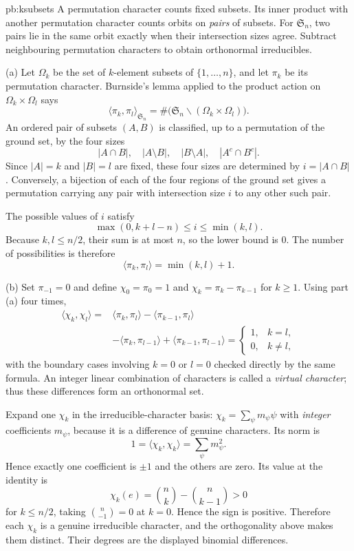 \begin{solution}{pb:ksubsets}
\idea A permutation character counts fixed subsets. Its inner product with another permutation character counts orbits on \emph{pairs} of subsets. For $\mathfrak S_n$, two pairs lie in the same orbit exactly when their intersection sizes agree. Subtract neighbouring permutation characters to obtain orthonormal irreducibles.

\writeup (a) Let $\Omega_k$ be the set of $k$-element subsets of $\{1,\ldots,n\}$, and let $\pi_k$ be its permutation character. Burnside's lemma applied to the product action on $\Omega_k\times\Omega_l$ says
\[
\langle\pi_k,\pi_l\rangle_{\mathfrak S_n}
=\#\bigl(\mathfrak S_n\backslash(\Omega_k\times\Omega_l)\bigr).
\]
An ordered pair of subsets $(A,B)$ is classified, up to a permutation of the ground set, by the four sizes
\[
|A\cap B|,\quad |A\setminus B|,\quad|B\setminus A|,\quad|A^c\cap B^c|.
\]
Since $|A|=k$ and $|B|=l$ are fixed, these four sizes are determined by $i=|A\cap B|$. Conversely, a bijection of each of the four regions of the ground set gives a permutation carrying any pair with intersection size $i$ to any other such pair.

The possible values of $i$ satisfy
\[
\max(0,k+l-n)\le i\le\min(k,l).
\]
Because $k,l\le n/2$, their sum is at most $n$, so the lower bound is $0$. The number of possibilities is therefore
\[
\boxed{\langle\pi_k,\pi_l\rangle=\min(k,l)+1}.
\]

(b) Set $\pi_{-1}=0$ and define $\chi_0=\pi_0=1$ and $\chi_k=\pi_k-\pi_{k-1}$ for $k\ge1$. Using part (a) four times,
\[
\begin{aligned}
\langle\chi_k,\chi_l\rangle
={}&\langle\pi_k,\pi_l\rangle
-\langle\pi_{k-1},\pi_l\rangle\\
&-\langle\pi_k,\pi_{l-1}\rangle
+\langle\pi_{k-1},\pi_{l-1}\rangle
=\begin{cases}1,&k=l,\\0,&k\ne l,\end{cases}
\end{aligned}
\]
with the boundary cases involving $k=0$ or $l=0$ checked directly by the same formula. An integer linear combination of characters is called a \emph{virtual character}; thus these differences form an orthonormal set.

Expand one $\chi_k$ in the irreducible-character basis: $\chi_k=\sum_\psi m_\psi\psi$ with \emph{integer} coefficients $m_\psi$, because it is a difference of genuine characters. Its norm is
\[
1=\langle\chi_k,\chi_k\rangle=\sum_\psi m_\psi^2.
\]
Hence exactly one coefficient is $\pm1$ and the others are zero. Its value at the identity is
\[
\chi_k(e)=\binom nk-\binom n{k-1}>0
\]
for $k\le n/2$, taking $\binom n{-1}=0$ at $k=0$. Hence the sign is positive. Therefore each $\chi_k$ is a genuine irreducible character, and the orthogonality above makes them distinct. Their degrees are the displayed binomial differences.


\end{solution}
